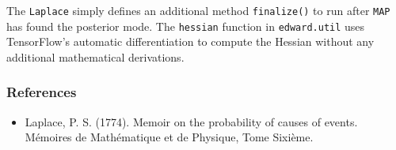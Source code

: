 The \texttt{Laplace} simply defines an additional method
\texttt{finalize()} to
run after \texttt{MAP} has found the posterior mode. The
\texttt{hessian} function in \texttt{edward.util} uses TensorFlow's
automatic differentiation to compute the Hessian without any
additional mathematical derivations.

\subsubsection{References}\label{references}

\begin{itemize}
\item
  Laplace, P. S. (1774). Memoir on the probability of causes of
  events. Mémoires de Mathématique et de Physique, Tome Sixième.
\end{itemize}
